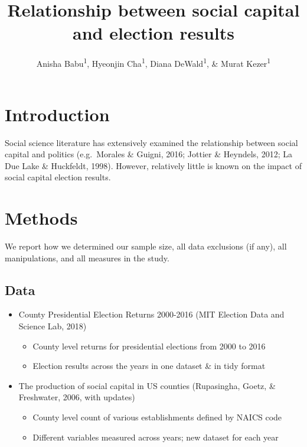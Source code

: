\documentclass[
  english,
  man]{apa6}
\title{Relationship between social capital and election results}
\author{Anisha Babu\textsuperscript{1}, Hyeonjin Cha\textsuperscript{1}, Diana DeWald\textsuperscript{1}, \& Murat Kezer\textsuperscript{1}}
\date{}
\affiliation{\vspace{0.5cm}\textsuperscript{1} University of Oregon}
\providecommand{\tightlist}{%
  \setlength{\itemsep}{0pt}\setlength{\parskip}{0pt}}
\begin{document}
\maketitle

\hypertarget{introduction}{%
\section{Introduction}\label{introduction}}

Social science literature has extensively examined the relationship between social capital and politics (e.g.~Morales \& Guigni, 2016; Jottier \& Heyndels, 2012; La Due Lake \& Huckfeldt, 1998). However, relatively little is known on the impact of social capital election results.

\hypertarget{methods}{%
\section{Methods}\label{methods}}

We report how we determined our sample size, all data exclusions (if any), all manipulations, and all measures in the study.

\hypertarget{data}{%
\subsection{Data}\label{data}}

\begin{itemize}
\tightlist
\item
  County Presidential Election Returns 2000-2016 (MIT Election Data and Science Lab, 2018)

  \begin{itemize}
  \tightlist
  \item
    County level returns for presidential elections from 2000 to 2016
  \item
    Election results across the years in one dataset \& in tidy format
  \end{itemize}
\item
  The production of social capital in US counties (Rupasingha, Goetz, \& Freshwater, 2006, with updates)

  \begin{itemize}
  \tightlist
  \item
    County level count of various establishments defined by NAICS code
  \item
    Different variables measured across years; new dataset for each year
  \end{itemize}
\end{itemize}
\end{document}
